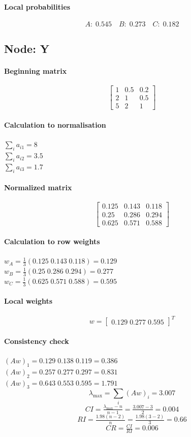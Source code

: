 \documentclass[11pt]{article}
\begin{document}
\paragraph{Local probabilities}
\[A:\; 0.545\quad B:\; 0.273\quad C:\; 0.182\]
\subsection*{Node: Y}
\paragraph{Beginning matrix}
\[\begin{bmatrix}
1 & 0.5 & 0.2 \\
2 & 1 & 0.5 \\
5 & 2 & 1
\end{bmatrix}\]
\paragraph{Calculation to normalisation}
\(\sum_i a_{i1} = 8\) \\ \(\sum_i a_{i2} = 3.5\) \\ \(\sum_i a_{i3} = 1.7\)
\paragraph{Normalized matrix}
\[\begin{bmatrix}
0.125 & 0.143 & 0.118 \\
0.25 & 0.286 & 0.294 \\
0.625 & 0.571 & 0.588
\end{bmatrix}\]
\paragraph{Calculation to row weights}
\(w_{A} = \tfrac{1}{3}(0.125 \; 0.143 \; 0.118) = 0.129\) \\ \(w_{B} = \tfrac{1}{3}(0.25 \; 0.286 \; 0.294) = 0.277\) \\ \(w_{C} = \tfrac{1}{3}(0.625 \; 0.571 \; 0.588) = 0.595\)
\paragraph{Local weights}
\[w = \begin{bmatrix} 0.129 \; 0.277 \; 0.595 \end{bmatrix}^{\!T}\]
\paragraph{Consistency check}
\((Aw)_{1} = 0.129 \; 0.138 \; 0.119 = 0.386\) \\ \((Aw)_{2} = 0.257 \; 0.277 \; 0.297 = 0.831\) \\ \((Aw)_{3} = 0.643 \; 0.553 \; 0.595 = 1.791\)
\[\lambda_{\max} = \sum_i (Aw)_i = 3.007\]
\[CI = \tfrac{\lambda_{\max}-n}{n-1} = \tfrac{3.007 - 3}{2} = 0.004\]
\[RI = \tfrac{1.98(n-2)}{n} = \tfrac{1.98(3-2)}{3} = 0.66\]
\[CR = \tfrac{CI}{RI} = 0.006\]
\end{document}
